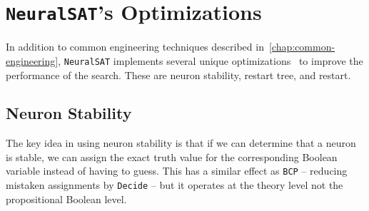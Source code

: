 \documentclass[oneside,11pt,dvipsnames]{book}
\numberwithin{equation}{section}
\theoremstyle{definition}
\theoremstyle{remark}
\newcommand{\functiontextformat}[1]{\textrm{\texttt{#1}}}
\newcommand{\neuralsat}{\texttt{NeuralSAT}}
\newcommand{\tool}{\texttt{NeuralSAT}}
\begin{document}
    






\section{\tool{}'s Optimizations}\label{sec:optimizations}

In addition to common engineering techniques described in~\autoref{chap:common-engineering}, \neuralsat{} implements several unique optimizations~\cite{duong2024harnessing} to improve the performance of the search. These are neuron stability, restart tree, and restart.


\subsection{Neuron Stability}\label{sec:stabilization}
The key idea in using neuron stability is that if we can determine that a neuron is stable,  we can assign the exact truth value for the corresponding Boolean variable instead of having to guess. This has a similar effect as \functiontextformat{BCP} -- reducing mistaken assignments by \functiontextformat{Decide} -- but it operates at the theory level not the propositional Boolean level.

\end{document}
